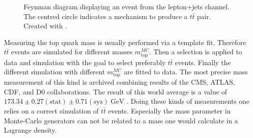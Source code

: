 	\begin{figure}
		\centering
		\caption{Feynman diagram \cite{feynman} displaying an event from the lepton+jets channel. The centred circle indicates a mechanism to produce a $t\bar{t}$ pair. Created with \cite{feynman}.}
		\label{fig:semilep}
	\end{figure}
	Measuring the top quark mass is usually performed via a template fit. Therefore $t\bar{t}$ events are simulated for different masses $m_\text{top}^{MC}$. Then a selection is applied to data and simulation with the goal to select preferably $t\bar{t}$ events. Finally the different simulation with different $m_\text{top}^{MC}$ are fitted to data.	The most precise mass measurement of this kind is archived combining results of the CMS, ATLAS, CDF, and D0 collaborations. The result of this world average is a value of $173.34 \pm 0.27 (\text{stat}) \pm 0.71 (\text{sys})\;\text{GeV}$ \cite{topmass_combination}. Doing these kinds of measurements one relies on a correct simulation of $t\bar{t}$ events. Especially the mass parameter in Monte-Carlo generators can not be related to a mass one would calculate in a Lagrange density.

	